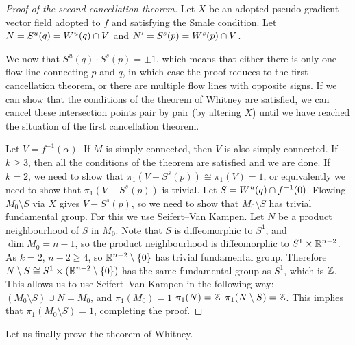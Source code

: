 \begin{proof}[Proof of the second cancellation theorem]
    Let $X$ be an adopted pseudo-gradient vector field adopted to  $f$ and satisfying the Smale condition.
    Let $N = S^{u}(q) = W^u(q) \cap V$ and $N' = S^{s}(p) = W^s(p) \cap  V$.

    We now that $S^{u}(q) \cdot S^{s}(p) = \pm 1$, which means that either there is only one flow line connecting $p$ and  $q$, in which case the proof reduces to the first cancellation theorem, or there are multiple flow lines with opposite signs.
    If we can show that the conditions of the theorem of Whitney are satisfied, we can cancel these intersection points pair by pair (by altering $X$) until we have reached the situation of the first cancellation theorem.

    Let $V = f^{-1}(\alpha)$.  If $M$ is simply connected, then $V$ is also simply connected.
    If $k \ge 3$, then all the conditions of the theorem are satisfied and we are done.
    If $k = 2$, we need to show that  $\pi_1(V - S^{s}(p)) \cong \pi_1(V) = 1$,
    or equivalently we need to show that $\pi_1(V - S^{s}(p))$ is trivial.
    Let $S = W^u(q) \cap f^{-1}(0)$.
    Flowing $M_0 \setminus S$ via $X$ gives  $V - S^{s}(p)$, so we need to show that $M_0 \setminus S$ has trivial fundamental group.
    For this we use Seifert--Van Kampen. Let $N$ be a product neighbourhood of $S$ in $M_0$.
    Note that $S$ is diffeomorphic to $S^{1}$, and $\dim M_0 = n-1$, so the product neighbourhood is diffeomorphic to $ S^1 \times \mathbb{R}^{n-2}$.
    As $k=2$, $n - 2 \ge 4$, so $\mathbb{R}^{n-2} \setminus \{ 0 \} $ has trivial fundamental group. Therefore $N \setminus S \cong S^{1} \times (\mathbb{R}^{n-2}\setminus \{0\})$ has the same fundamental group as $S^{1}$, which is $\mathbb{Z}$.
    This allows us to use Seifert--Van Kampen in the following way:
    $(M_0 \setminus S) \cup N = M_0$, and $\pi_1(M_0) = 1$ $\pi_1(N) = \mathbb{Z}$ $\pi_1(N \setminus S) = \mathbb{Z}$. This implies that $\pi_1(M_0 \setminus S) = 1$, completing the proof.
\end{proof}

Let us finally prove the theorem of Whitney.

